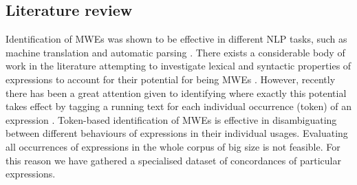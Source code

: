 \documentclass[output=paper
,modfonts
,nonflat]{langsci/langscibook}
\begin{document}



\subsection{Literature review}

Identification of MWEs was shown to be effective in different NLP tasks, such as machine translation \citep{pal2011} and automatic parsing \citep{Constant2012}.
There exists a considerable body of work in the literature attempting to investigate lexical and syntactic properties of expressions to account for their potential for being MWEs \citep{ramisch2014multiword,baldwin2010multiword}. 
However, recently there has been a great attention given to identifying where exactly this potential takes effect by tagging a running text for each individual occurrence (token) of an expression \citep{Schneider14b,constant2012evaluating,Gharbieh2017}. 
Token-based identification of MWEs is effective in disambiguating between different behaviours of expressions in their individual usages. 
Evaluating all occurrences of expressions in the whole corpus of big size is not feasible. For this reason we have gathered a specialised dataset of concordances of particular expressions.
\end{document}
